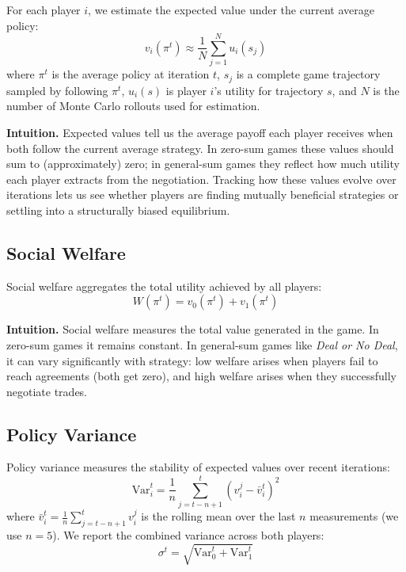 \documentclass[11pt]{article}
\begin{document}
For each player $i$, we estimate the expected value under the current average policy:
\begin{equation}
v_i(\pi^t) \approx \frac{1}{N} \sum_{j=1}^{N} u_i(s_j)
\end{equation}
where $\pi^t$ is the average policy at iteration $t$, $s_j$ is a complete game trajectory sampled by following $\pi^t$, $u_i(s)$ is player $i$'s utility for trajectory $s$, and $N$ is the number of Monte Carlo rollouts used for estimation.

\textbf{Intuition.} Expected values tell us the average payoff each player receives when both follow the current average strategy. In zero-sum games these values should sum to (approximately) zero; in general-sum games they reflect how much utility each player extracts from the negotiation. Tracking how these values evolve over iterations lets us see whether players are finding mutually beneficial strategies or settling into a structurally biased equilibrium.

\subsection{Social Welfare}

Social welfare aggregates the total utility achieved by all players:
\begin{equation}
W(\pi^t) = v_0(\pi^t) + v_1(\pi^t)
\end{equation}

\textbf{Intuition.} Social welfare measures the total value generated in the game. In zero-sum games it remains constant. In general-sum games like \emph{Deal or No Deal}, it can vary significantly with strategy: low welfare arises when players fail to reach agreements (both get zero), and high welfare arises when they successfully negotiate trades.

\subsection{Policy Variance}

Policy variance measures the stability of expected values over recent iterations:
\begin{equation}
\text{Var}_i^t = \frac{1}{n} \sum_{j=t-n+1}^{t} (v_i^j - \bar{v}_i^t)^2
\end{equation}
where $\bar{v}_i^t = \frac{1}{n}\sum_{j=t-n+1}^{t} v_i^j$ is the rolling mean over the last $n$ measurements (we use $n=5$). We report the combined variance across both players:
\begin{equation}
\sigma^t = \sqrt{\text{Var}_0^t + \text{Var}_1^t}
\end{equation}
\end{document}

